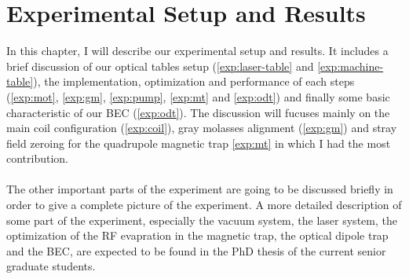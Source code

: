 \chapter{Experimental Setup and Results}

In this chapter, I will describe our experimental setup and results. It includes a brief discussion of our optical tables setup (\ref{exp:laser-table} and \ref{exp:machine-table}), the implementation, optimization and performance of each steps (\ref{exp:mot}, \ref{exp:gm}, \ref{exp:pump}, \ref{exp:mt} and \ref{exp:odt}) and finally some basic characteristic of our BEC (\ref{exp:odt}). The discussion will fucuses mainly on the main coil configuration (\ref{exp:coil}), gray molasses alignment (\ref{exp:gm}) and stray field zeroing for the quadrupole magnetic trap \ref{exp:mt} in which I had the most contribution.\\
\\
The other important parts of the experiment are going to be discussed briefly in order to give a complete picture of the experiment. A more detailed description of some part of the experiment, especially the vacuum system, the laser system, the optimization of the RF evapration in the magnetic trap, the optical dipole trap and the BEC, are expected to be found in the PhD thesis of the current senior graduate students.

